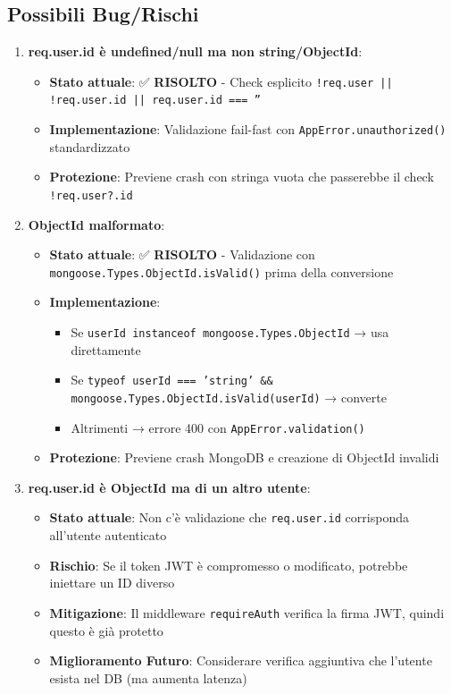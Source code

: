 \documentclass[11pt,a4paper]{article}
\begin{document}
\subsection{Possibili Bug/Rischi}

\begin{enumerate}
    \item \textbf{req.user.id è undefined/null ma non string/ObjectId}:
    \begin{itemize}
        \item \textbf{Stato attuale}: ✅ \textbf{RISOLTO} - Check esplicito \texttt{!req.user || !req.user.id || req.user.id === ''}
        \item \textbf{Implementazione}: Validazione fail-fast con \texttt{AppError.unauthorized()} standardizzato
        \item \textbf{Protezione}: Previene crash con stringa vuota che passerebbe il check \texttt{!req.user?.id}
    \end{itemize}
    
    \item \textbf{ObjectId malformato}:
    \begin{itemize}
        \item \textbf{Stato attuale}: ✅ \textbf{RISOLTO} - Validazione con \texttt{mongoose.Types.ObjectId.isValid()} prima della conversione
        \item \textbf{Implementazione}: 
        \begin{itemize}
            \item Se \texttt{userId instanceof mongoose.Types.ObjectId} → usa direttamente
            \item Se \texttt{typeof userId === 'string' && mongoose.Types.ObjectId.isValid(userId)} → converte
            \item Altrimenti → errore 400 con \texttt{AppError.validation()}
        \end{itemize}
        \item \textbf{Protezione}: Previene crash MongoDB e creazione di ObjectId invalidi
    \end{itemize}
    
    \item \textbf{req.user.id è ObjectId ma di un altro utente}:
    \begin{itemize}
        \item \textbf{Stato attuale}: Non c'è validazione che \texttt{req.user.id} corrisponda all'utente autenticato
        \item \textbf{Rischio}: Se il token JWT è compromesso o modificato, potrebbe iniettare un ID diverso
        \item \textbf{Mitigazione}: Il middleware \texttt{requireAuth} verifica la firma JWT, quindi questo è già protetto
        \item \textbf{Miglioramento Futuro}: Considerare verifica aggiuntiva che l'utente esista nel DB (ma aumenta latenza)
    \end{itemize}
    

\end{enumerate}
\end{document}
